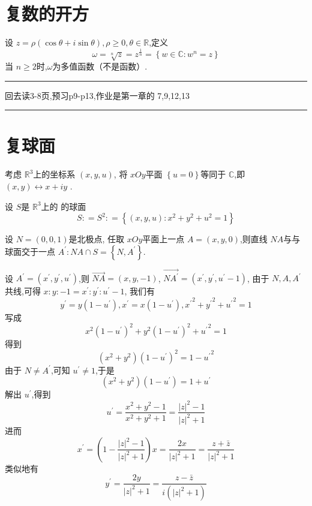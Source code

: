 \documentclass[../../复变函数.tex]{subfiles}
\begin{document}
\section{复数的开方}

设 \(  z =  \rho \left( \cos  \theta + i\sin  \theta  \right),\rho \ge 0, \theta  \in \mathbb{R}    \),定义 \[
 \omega  =  \sqrt[n]{z} =  z^{\frac{1}{n}} =  \left\{w\in \mathbb{C} : w^{n}= z \right\}
\] 当 \(  n\ge 2  \)时,\(   \omega   \)为多值函数（不是函数）.  


\hspace*{\fill} 
\hrule
\hspace*{\fill}

回去读3-8页,预习p9-p13,作业是第一章的 7,9,12,13

\hspace*{\fill} 
\hrule
\hspace*{\fill}



\section{复球面}

考虑 \(  \mathbb{R} ^{3}  \)上的坐标系 \(  \left( x,y,u \right)   \),
将 \(  xOy  \)平面 \(  \left\{ u = 0 \right\}  \)等同于 \(  \mathbb{C}   \),即 \(  \left( x,y \right) \leftrightarrow x+ iy   \) .     

设 \(  S  \)是  \(  \mathbb{R} ^{3}  \)上的 的球面 \[
S : = S^{2}: =   \left\{ \left( x,y,u \right): x^{2}+ y^{2}+ u^{2}  = 1\right\}
\] 

设 \(  N= \left( 0,0,1 \right)   \)是北极点, 
任取 \(  xOy  \)平面上一点 \(  A = \left( x,y,0 \right)   \),则直线 \(  NA  \)与与球面交于一点 \(  A^{\prime} : NA\cap S =  \left\{ N,A^{\prime}  \right\}  \).

设 \(  A^{\prime}  =  \left( x^{\prime} ,y^{\prime} ,u^{\prime}  \right)   \),则 \(  \vec{NA} = \left( x,y,-1 \right)   \), \(\vec{NA^{\prime} } =  \left( x^{\prime} ,y^{\prime} ,u^{\prime} -1 \right)   \),
由于 \(  N,A,A^{\prime}   \)共线,可得 \(  x:y:-1= x^{\prime} :y^{\prime} :u^{\prime} -1  \), 
我们有 \[
y^{\prime}  =  y\left( 1-u^{\prime}  \right), x^{\prime}  =  x\left( 1-u^{\prime}  \right),  {x^{\prime} }^{2} + {y^{\prime} }^{2}+  {u^{\prime} }^{2}= 1 
\]    写成 \[
x^{2}\left( 1-u^{\prime}  \right)^{2} + y^{2}\left( 1-u^{\prime}  \right)^{2} + {u^{\prime} }^{2}= 1  
\]得到 \[
\left( x^{2}+ y^{2} \right)\left( 1-u^{\prime}  \right)^{2} = 1-{u^{\prime} }^{2}  
\]
由于 \(  N \neq A^{\prime}   \),可知 \(  u^{\prime}  \neq 1  \),于是 \[
\left( x^{2}+ y^{2} \right)\left( 1-u^{\prime}  \right)= 1+ u^{\prime}   
\]  解出 \(  u^{\prime}   \),得到 \[
u^{\prime}  =  \frac{x^{2}+ y^{2}-1 }{x^{2}+ y^{2}+ 1 } = \frac{\left| z \right|^{2}-1  }{\left| z \right|^{2}+ 1  }  
\] 进而 \[
x^{\prime}  =  \left( 1- \frac{\left| z \right|^{2}-1  }{ \left| z \right|^{2}+ 1 }  \right) x =   \frac{2x }{ \left| z \right|^{2}+ 1 } =  \frac{ z+  \bar{z} }{\left| z \right|^{2}+ 1  }  
\]类似地有 \[
y^{\prime}  = \frac{2y }{\left| z \right|^{2}+ 1  } =  \frac{z-\bar{z} }{i\left( \left| z \right|^{2}+ 1 \right)   }  
\]
\end{document}
